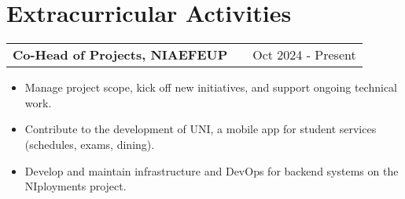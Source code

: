 \documentclass[a4paper,12pt]{article}
\makeatletter
\newenvironment{joblong}[2]
    {
    \begin{tabularx}{\linewidth}{@{}l X r@{}}
    \textbf{#1} & \hfill &  #2 \\[3.75pt]
    \end{tabularx}
    \begin{minipage}[t]{\linewidth}
    \begin{itemize}[nosep,after=\strut, leftmargin=1em, itemsep=3pt,label=--]
    }
    {
    \end{itemize}
    \end{minipage}    
    }
\makeatother
\begin{document}










\section{Extracurricular Activities}

\begin{joblong}{Co-Head of Projects, NIAEFEUP}{Oct 2024 - Present}
    \item Manage project scope, kick off new initiatives, and support ongoing technical work.
    \item Contribute to the development of UNI, a mobile app for student services (schedules, exams, dining).
    \item Develop and maintain infrastructure and DevOps for backend systems on the NIployments project.
\end{joblong}
\end{document}
